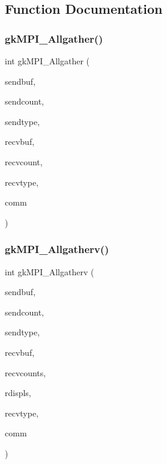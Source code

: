 \subsection{Function Documentation}
\mbox{\label{a00359_a0b7a139ad6fb30c1ae40ac2b57188f1a}} 
\subsubsection{\texorpdfstring{gk\+M\+P\+I\+\_\+\+Allgather()}{gkMPI\_Allgather()}}
{\footnotesize\ttfamily int gk\+M\+P\+I\+\_\+\+Allgather (\begin{DoxyParamCaption}\item[{void $\ast$}]{sendbuf,  }\item[{\hyperlink{a00876_aaa5262be3e700770163401acb0150f52}{idx\+\_\+t}}]{sendcount,  }\item[{M\+P\+I\+\_\+\+Datatype}]{sendtype,  }\item[{void $\ast$}]{recvbuf,  }\item[{\hyperlink{a00876_aaa5262be3e700770163401acb0150f52}{idx\+\_\+t}}]{recvcount,  }\item[{M\+P\+I\+\_\+\+Datatype}]{recvtype,  }\item[{M\+P\+I\+\_\+\+Comm}]{comm }\end{DoxyParamCaption})}

\mbox{\label{a00359_a0b0b0098f344cad26f02c6f825bdde2c}} 
\subsubsection{\texorpdfstring{gk\+M\+P\+I\+\_\+\+Allgatherv()}{gkMPI\_Allgatherv()}}
{\footnotesize\ttfamily int gk\+M\+P\+I\+\_\+\+Allgatherv (\begin{DoxyParamCaption}\item[{void $\ast$}]{sendbuf,  }\item[{\hyperlink{a00876_aaa5262be3e700770163401acb0150f52}{idx\+\_\+t}}]{sendcount,  }\item[{M\+P\+I\+\_\+\+Datatype}]{sendtype,  }\item[{void $\ast$}]{recvbuf,  }\item[{\hyperlink{a00876_aaa5262be3e700770163401acb0150f52}{idx\+\_\+t} $\ast$}]{recvcounts,  }\item[{\hyperlink{a00876_aaa5262be3e700770163401acb0150f52}{idx\+\_\+t} $\ast$}]{rdispls,  }\item[{M\+P\+I\+\_\+\+Datatype}]{recvtype,  }\item[{M\+P\+I\+\_\+\+Comm}]{comm }\end{DoxyParamCaption})}

